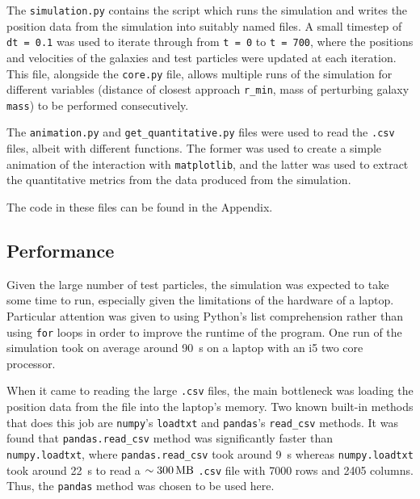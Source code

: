 \documentclass[twoside,twocolumn]{article}
\begin{document}
        The \texttt{simulation.py} contains the script which runs the simulation and writes the position data from the simulation into suitably named files. A small timestep of \texttt{dt = 0.1} was used to iterate through from \texttt{t = 0} to \texttt{t = 700}, where the positions and velocities of the galaxies and test particles were updated at each iteration. This file, alongside the \texttt{core.py} file, allows multiple runs of the simulation for different variables (distance of closest approach \texttt{r\_min}, mass of perturbing galaxy \texttt{mass}) to be performed consecutively.
        
        The \texttt{animation.py} and \texttt{get\_quantitative.py} files were used to read the \texttt{.csv} files, albeit with different functions. The former was used to create a simple animation of the interaction with \texttt{matplotlib}, and the latter was used to extract the quantitative metrics from the data produced from the simulation.

        The code in these files can be found in the Appendix.

        
        
    \subsection{Performance}
    
    Given the large number of test particles, the simulation was expected to take some time to run, especially given the limitations of the hardware of a laptop. Particular attention was given to using Python's list comprehension rather than using \texttt{for} loops in order to improve the runtime of the program. One run of the simulation took on average around \SI{90}{\second} on a laptop with an i5 two core processor.
    
    When it came to reading the large \texttt{.csv} files, the main bottleneck was loading the position data from the file into the laptop's memory. Two known built-in methods that does this job are \texttt{numpy}'s \texttt{loadtxt} and \texttt{pandas}'s \texttt{read\_csv} methods. It was found that \texttt{pandas.read\_csv} method was significantly faster than \texttt{numpy.loadtxt}, where \texttt{pandas.read\_csv} took around \SI{9}{\second} whereas \texttt{numpy.loadtxt} took around \SI{22}{\second} to read a $\sim \SI{300}{\mega\byte}$ \texttt{.csv} file with 7000 rows and 2405 columns. Thus, the \texttt{pandas} method was chosen to be used here.
        
\end{document}
